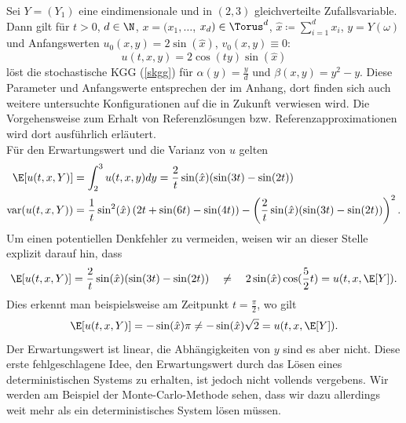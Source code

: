 \begin{mathbsp}
\label{bsp:trial1}
Sei $Y=(Y_1)$ eine eindimensionale und in $(2,3)$ gleichverteilte Zufallsvariable. Dann gilt für $t>0$, $d\in\N$, $x=(x_1,\dots$, $x_d)\in\Torus^d$, $\hat{x}\coloneqq \sum_{i=1}^d x_i$, $y=Y(\omega)$ und Anfangswerten $u_0(x,y)=2\sin(\hat{x})$, $v_0(x,y)\equiv 0:$
\begin{equation*}
u(t,x,y)=2\cos(ty)\sin(\hat{x})
\end{equation*}
löst die stochastische KGG (\ref{skgg}) für $\alpha(y)=\frac{y}{d}$ und $\beta(x,y)=y^2-y$. Diese Parameter und Anfangswerte entsprechen der  im Anhang, dort finden sich auch weitere untersuchte Konfigurationen auf die in Zukunft verwiesen wird. Die Vorgehensweise zum Erhalt von Referenzlösungen bzw. Referenzapproximationen wird dort ausführlich erläutert.\\
Für den Erwartungswert und die Varianz von $u$ gelten
\begin{align*}
\E[u(t,x,Y)]&=\int_2^3u(t,x,y)dy=\frac{2}{t}\sin(\hat{x})(\sin(3t) - \sin(2t))\\
\text{var}(u(t,x,Y))&=\frac{1}{t}\sin^2(\hat{x})\left(2t + \sin(6t) - \sin(4t)\right)- \left(\frac{2}{t}\sin(\hat{x})(\sin(3t) - \sin(2t))\right)^2.
\end{align*}
Um einen potentiellen Denkfehler zu vermeiden, weisen wir an dieser Stelle explizit darauf hin, dass 
\[\E[u(t,x,Y)]=\frac{2}{t}\sin(\hat{x})(\sin(3t) - \sin(2t))\quad \neq \quad 2\sin(\hat{x})\cos(\frac{5}{2}t)=u(t,x,\E[Y]).\]
Dies erkennt man beispielsweise am Zeitpunkt $t=\frac{\pi}{2}$, wo gilt
\[\E[u(t,x,Y)]=-\sin(\hat{x})\pi \neq -\sin(\hat{x})\sqrt{2}=u(t,x,\E[Y]).\]
Der Erwartungswert ist linear, die Abhängigkeiten von $y$ sind es aber nicht. Diese erste fehlgeschlagene Idee, den Erwartungswert durch das Lösen eines deterministischen Systems zu erhalten, ist jedoch nicht vollends vergebens. Wir werden am Beispiel der Monte-Carlo-Methode sehen, dass wir dazu allerdings weit mehr als ein deterministisches System lösen müssen.
\end{mathbsp}

